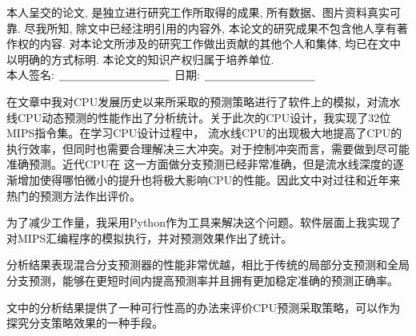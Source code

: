 {%

本人呈交的论文, 是独立进行研究工作所取得的成果,
所有数据、图片资料真实可靠. 尽我所知, 除文中已经注明引用的内容外,
本论文的研究成果不包含他人享有著作权的内容.
对本论文所涉及的研究工作做出贡献的其他个人和集体,
均已在文中以明确的方式标明. 本论文的知识产权归属于培养单位.\\[2cm]

\hspace*{1cm}本人签名: $\underline{\hspace{3.5cm}}$
\hspace{2cm}日期: $\underline{\hspace{3.5cm}}$\hfill\par}
\baselineskip=23pt  %





\begin{cnabstract}
在文章中我对CPU发展历史以来所采取的预测策略进行了软件上的模拟，对流水线CPU动态预测的性能作出了分析统计。关于此次的CPU设计，我实现了32位MIPS指令集。在学习CPU设计过程中，
流水线CPU的出现极大地提高了CPU的执行效率，但同时也需要合理解决三大冲突。对于控制冲突而言，需要做到尽可能准确预测。近代CPU在
这一方面做分支预测已经非常准确，但是流水线深度的逐渐增加使得哪怕微小的提升也将极大影响CPU的性能。因此文中对过往和近年来热门的预测方法作出评价。\par
为了减少工作量，我采用Python作为工具来解决这个问题。软件层面上我实现了对MIPS汇编程序的模拟执行，并对预测效果作出了统计。\par
分析结果表现混合分支预测器的性能非常优越，相比于传统的局部分支预测和全局分支预测，能够在更短时间内提高预测率并且拥有更加稳定准确的预测正确率。\par
文中的分析结果提供了一种可行性高的办法来评价CPU预测采取策略，可以作为探究分支策略效果的一种手段。


\end{cnabstract}
\par
\vspace*{2em}






